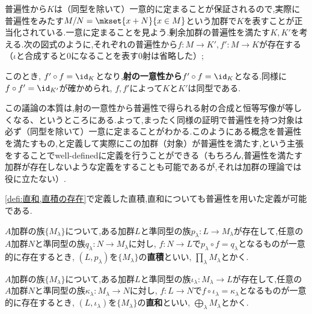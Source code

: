 普遍性から$K$は（同型を除いて）一意的に定まることが保証されるので,実際に普遍性をみたす$M/N=\mkset{x+N}{x\in M}$という加群で$K$を表すことが正当化されている.一意に定まることを見よう.剰余加群の普遍性を満たす$K,K'$を考える.次の図式のように,それぞれの普遍性から$f:M\to K',f':M\to K$が存在する（$\iota$と合成すると$0$になることを表す$0$射は省略した）;
\begin{figure}[H]
	\centering
	\caption{}
\end{figure}

このとき, $f'\circ f=\id_K$となり,\textbf{射の一意性から}$f'\circ f=\id_K$となる.同様に$f\circ f'=\id_{K'}$が確かめられ, $f,f'$によって$K$と$K'$は同型である.

この議論の本質は,射の一意性から普遍性で得られる射の合成と恒等写像が等しくなる、というところにある.よって,まったく同様の証明で普遍性を持つ対象は必ず（同型を除いて）一意に定まることがわかる.このようにある概念を普遍性を満たすもの,と定義して実際にこの加群（対象）が普遍性を満たす,という主張をすることでwell-definedに定義を行うことができる（もちろん,普遍性を満たす加群が存在しないような定義をすることも可能であるが,それは加群の理論では役に立たない）.

\ref{defi:直和,直積の存在}で定義した直積,直和についても普遍性を用いた定義が可能である.

\begin{defi}[普遍性を用いた直積の定義]
	$A$加群の族$\{M_\lambda\}$について,ある加群$L$と準同型の族$p_\lambda:L\to M_\lambda$が存在して,任意の$A$加群$N$と準同型の族$q_\lambda:N\to M_\lambda$に対し, $f:N\to L$で$p_\lambda\circ f=q_\lambda$となるものが一意的に存在するとき, $(L,p_\lambda)$を$\{M_\lambda\}$の\textbf{直積}といい, $\prod_\lambda M_\lambda$とかく.
\end{defi}

\begin{defi}[普遍性を用いた直和の定義]
	$A$加群の族$\{M_\lambda\}$について,ある加群$L$と準同型の族$\iota_\lambda: M_\lambda\to L$が存在して,任意の$A$加群$N$と準同型の族$\kappa_\lambda: M_\lambda\to N$に対し, $f:L\to N$で$f\circ\iota_\lambda=\kappa_\lambda$となるものが一意的に存在するとき, $(L,\iota_\lambda)$を$\{M_\lambda\}$の\textbf{直和}といい, $\bigoplus_\lambda M_\lambda$とかく.
\end{defi}

